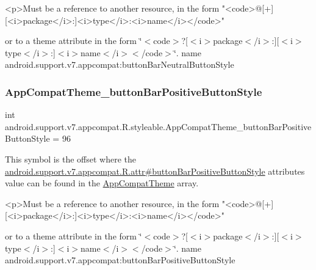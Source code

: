 \begin{DoxyVerb}      <p>Must be a reference to another resource, in the form "<code>@[+][<i>package</i>:]<i>type</i>:<i>name</i></code>"
\end{DoxyVerb}
 or to a theme attribute in the form \char`\"{}$<$code$>$?\mbox{[}$<$i$>$package$<$/i$>$\+:\mbox{]}\mbox{[}$<$i$>$type$<$/i$>$\+:\mbox{]}$<$i$>$name$<$/i$>$$<$/code$>$\char`\"{}.  name android.\+support.\+v7.\+appcompat\+:button\+Bar\+Neutral\+Button\+Style \mbox{\label{classandroid_1_1support_1_1v7_1_1appcompat_1_1R_1_1styleable_a5a97b06013106a661c91f3f55df6b4d0}} 
\subsubsection{\texorpdfstring{App\+Compat\+Theme\+\_\+button\+Bar\+Positive\+Button\+Style}{AppCompatTheme\_buttonBarPositiveButtonStyle}}
{\footnotesize\ttfamily int android.\+support.\+v7.\+appcompat.\+R.\+styleable.\+App\+Compat\+Theme\+\_\+button\+Bar\+Positive\+Button\+Style = 96\hspace{0.3cm}{\ttfamily [static]}}

This symbol is the offset where the \hyperlink{classandroid_1_1support_1_1v7_1_1appcompat_1_1R_1_1attr_a919556ddd9405e7315143fdba7448487}{android.\+support.\+v7.\+appcompat.\+R.\+attr\#button\+Bar\+Positive\+Button\+Style} attribute\textquotesingle{}s value can be found in the \hyperlink{classandroid_1_1support_1_1v7_1_1appcompat_1_1R_1_1styleable_a5c42f89e8a410c323be34208d75c430b}{App\+Compat\+Theme} array.

\begin{DoxyVerb}      <p>Must be a reference to another resource, in the form "<code>@[+][<i>package</i>:]<i>type</i>:<i>name</i></code>"
\end{DoxyVerb}
 or to a theme attribute in the form \char`\"{}$<$code$>$?\mbox{[}$<$i$>$package$<$/i$>$\+:\mbox{]}\mbox{[}$<$i$>$type$<$/i$>$\+:\mbox{]}$<$i$>$name$<$/i$>$$<$/code$>$\char`\"{}.  name android.\+support.\+v7.\+appcompat\+:button\+Bar\+Positive\+Button\+Style \mbox{\label{classandroid_1_1support_1_1v7_1_1appcompat_1_1R_1_1styleable_a5f507e4262ada8a443068f2d7537585f}} 
